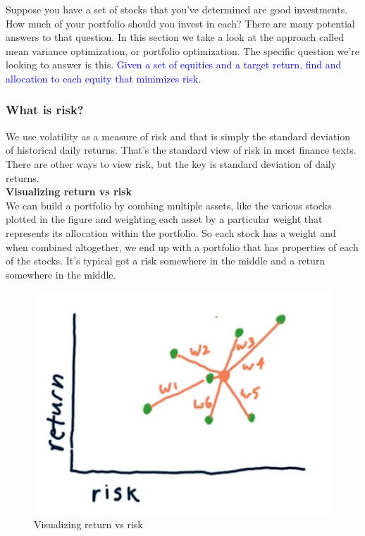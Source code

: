 \documentclass[12pt]{article}
\begin{document}
Suppose you have a set of stocks that you've determined are good investments. How much of your portfolio should you invest in each? There are many potential answers to that question. In this section we take a look at the approach called mean variance optimization, or portfolio optimization. The specific question we're looking to answer is this. \textcolor{blue}{Given a set of equities and a target return, find and allocation to each equity that minimizes risk.}

\subsubsection{What is risk?}

We use volatility as a measure of risk and that is simply the standard deviation of historical daily returns. That's the standard view of risk in most finance texts. There are other ways to view risk, but the key is standard deviation of daily returns. \\[8pt]
\noindent
\textbf{Visualizing return vs risk}  \\
We can build a portfolio by combing multiple assets, like the various stocks plotted in the figure and weighting each asset by a particular weight that represents its allocation within the portfolio. So each stock has a weight and when combined altogether, we end up with a portfolio that has properties of each of the stocks. It's typical got a risk somewhere in the middle and a return somewhere in the middle. 

\begin{figure}[!ht]
\centering
\includegraphics[scale=0.5]{fig/fig67}
\caption{Visualizing return vs risk}
\end{figure}
\end{document}
